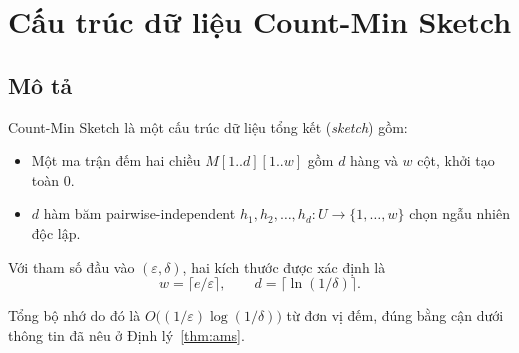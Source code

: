 \section{Cấu trúc dữ liệu Count-Min Sketch}

\subsection{Mô tả}

Count-Min Sketch \cite{cormode2005cms} là một cấu trúc dữ liệu tổng kết (\textit{sketch}) gồm:

\begin{itemize}
  \item Một ma trận đếm hai chiều $M[1..d][1..w]$ gồm $d$ hàng và $w$ cột, khởi tạo toàn 0.
  \item $d$ hàm băm pairwise-independent $h_1, h_2, \ldots, h_d: U \to \{1, \ldots, w\}$ chọn ngẫu nhiên độc lập.
\end{itemize}

Với tham số đầu vào $(\varepsilon, \delta)$, hai kích thước được xác định là
\begin{equation}
w = \bigl\lceil e/\varepsilon \bigr\rceil, \qquad d = \bigl\lceil \ln(1/\delta) \bigr\rceil.
\label{eq:cms-parameters}
\end{equation}

Tổng bộ nhớ do đó là $O\bigl((1/\varepsilon)\log(1/\delta)\bigr)$ từ đơn vị đếm, đúng bằng cận dưới thông tin đã nêu ở Định lý~\ref{thm:ams}.


